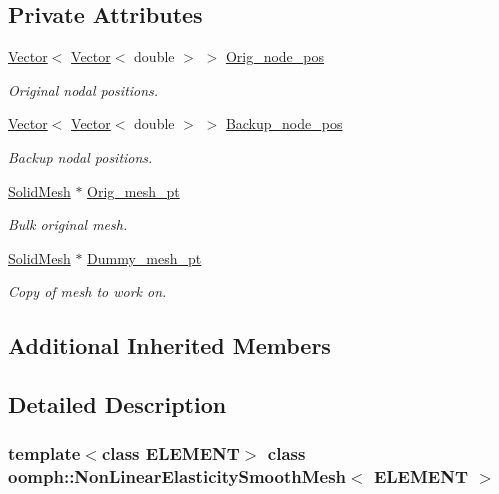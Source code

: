 \subsection*{Private Attributes}
\begin{DoxyCompactItemize}
\item 
\hyperlink{classoomph_1_1Vector}{Vector}$<$ \hyperlink{classoomph_1_1Vector}{Vector}$<$ double $>$ $>$ \hyperlink{classoomph_1_1NonLinearElasticitySmoothMesh_a0d59ca9e732fafa9c1d70c85cdefbb74}{Orig\+\_\+node\+\_\+pos}
\begin{DoxyCompactList}\small\item\em Original nodal positions. \end{DoxyCompactList}\item 
\hyperlink{classoomph_1_1Vector}{Vector}$<$ \hyperlink{classoomph_1_1Vector}{Vector}$<$ double $>$ $>$ \hyperlink{classoomph_1_1NonLinearElasticitySmoothMesh_a6ae3b3800d408d21fe1e6fa68575f58a}{Backup\+\_\+node\+\_\+pos}
\begin{DoxyCompactList}\small\item\em Backup nodal positions. \end{DoxyCompactList}\item 
\hyperlink{classoomph_1_1SolidMesh}{Solid\+Mesh} $\ast$ \hyperlink{classoomph_1_1NonLinearElasticitySmoothMesh_a24fd838e1a0a8b8a7fe59249349e7da3}{Orig\+\_\+mesh\+\_\+pt}
\begin{DoxyCompactList}\small\item\em Bulk original mesh. \end{DoxyCompactList}\item 
\hyperlink{classoomph_1_1SolidMesh}{Solid\+Mesh} $\ast$ \hyperlink{classoomph_1_1NonLinearElasticitySmoothMesh_a3034da1f2e87fd7dcbabd6883ba7cdd9}{Dummy\+\_\+mesh\+\_\+pt}
\begin{DoxyCompactList}\small\item\em Copy of mesh to work on. \end{DoxyCompactList}\end{DoxyCompactItemize}
\subsection*{Additional Inherited Members}


\subsection{Detailed Description}
\subsubsection*{template$<$class E\+L\+E\+M\+E\+NT$>$\newline
class oomph\+::\+Non\+Linear\+Elasticity\+Smooth\+Mesh$<$ E\+L\+E\+M\+E\+N\+T $>$}

